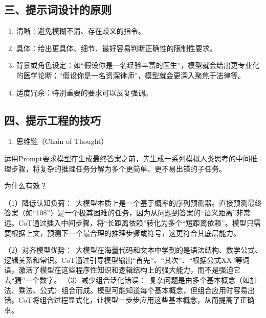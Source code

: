 \hypertarget{ux4e09ux63d0ux793aux8bcdux8bbeux8ba1ux7684ux539fux5219}{%
\subsection{三、提示词设计的原则}\label{ux4e09ux63d0ux793aux8bcdux8bbeux8ba1ux7684ux539fux5219}}

\begin{enumerate}
\def\labelenumi{\arabic{enumi}.}
\item
  清晰：避免模糊不清、存在歧义的指令。
\item
  具体：给出更具体、细节、最好容易判断正确性的限制性要求。
\item
  背景或角色设定：如``假设你是一名经验丰富的医生''，模型就会给出更专业化的医学论断；``假设你是一名资深律师''，模型就会更深入聚焦于法律等。
\item
  适度冗余：特别重要的要求可以反复强调。
\end{enumerate}

\hypertarget{ux56dbux63d0ux793aux5de5ux7a0bux7684ux6280ux5de7}{%
\subsection{四、提示工程的技巧}\label{ux56dbux63d0ux793aux5de5ux7a0bux7684ux6280ux5de7}}

\begin{enumerate}
\def\labelenumi{\arabic{enumi}.}
\tightlist
\item
  思维链（Chain of Thought）
\end{enumerate}

运用Prompt要求模型在生成最终答案之前，先生成一系列模拟人类思考的中间推理步骤，将复杂的推理任务分解为多个更简单、更不易出错的子任务。

为什么有效？

（1）降低认知负荷：~大模型本质上是一个基于概率的序列预测器。直接预测最终答案（如``108''）是一个极其困难的任务，因为从问题到答案的``语义距离''非常远。CoT通过插入中间步骤，将``长距离依赖''转化为多个``短距离依赖''。模型只需要根据上文，预测下一个最合理的推理步骤或符号，这更符合其底层能力。

（2）对齐模型优势：~大模型在海量代码和文本中学到的是语法结构、数学公式、逻辑关系和常识。CoT通过引导模型输出``首先''、``其次''、``根据公式XX''等词语，激活了模型在这些程序性知识和逻辑结构上的强大能力，而不是强迫它去``猜''一个数字。
（3）减少组合泛化错误：~复杂问题是由多个基本概念（如加法、乘法、公式）组合而成。模型可能知道每个基本概念，但组合应用时容易出错。CoT将组合过程显式化，让模型一步步应用这些基本概念，从而提高了正确率。

